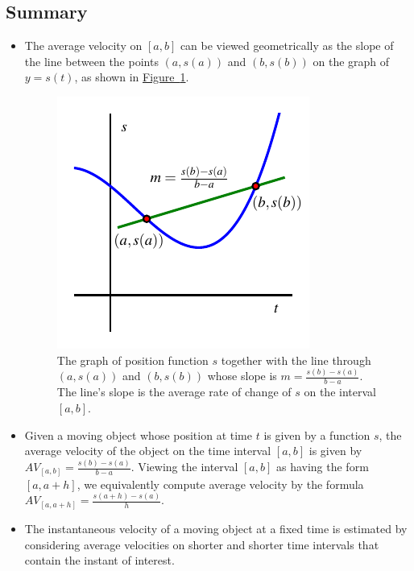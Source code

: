 \documentclass[10pt,]{book}
\theoremstyle{plain}
\theoremstyle{definition}
\theoremstyle{definition}
\theoremstyle{definition}
\theoremstyle{definition}
\theoremstyle{definition}
\numberwithin{equation}{section}
\begin{document}
\subsection[{Summary}]{Summary}\label{subsection-4}
\leavevmode%
\begin{itemize}[label=\textbullet]
\item{}The average velocity on \([a,b]\) can be viewed geometrically as the slope of the line between the points \((a,s(a))\) and \((b,s(b))\) on the graph of \(y = s(t)\), as shown in \hyperref[F-1-1-Summary]{Figure~\ref{F-1-1-Summary}}.
  \leavevmode%
\begin{figure}
\centering
\includegraphics[width=0.5\linewidth]{images/1_1_Summary}
\caption{The graph of position function \(s\) together with the line through \((a,s(a))\) and \((b,s(b))\) whose slope is \(m = \frac{s(b)-s(a)}{b-a}\).  The line's slope is the average rate of change of \(s\) on the interval \([a,b]\).\label{F-1-1-Summary}}
\end{figure}
%
\item{}Given a moving object whose position at time \(t\) is given by a function \(s\), the average velocity of the object on the time interval \([a,b]\) is given by \(AV_{[a,b]} = \frac{s(b) - s(a)}{b-a}\). Viewing the interval \([a,b]\) as having the form \([a,a+h]\), we equivalently compute average velocity by the formula \(AV_{[a,a+h]} = \frac{s(a+h) - s(a)}{h}\).%
\item{}The instantaneous velocity of a moving object at a fixed time is estimated by considering average velocities on shorter and shorter time intervals that contain the instant of interest.%
\end{itemize}
\typeout{************************************************}
\typeout{************************************************}
\end{document}
